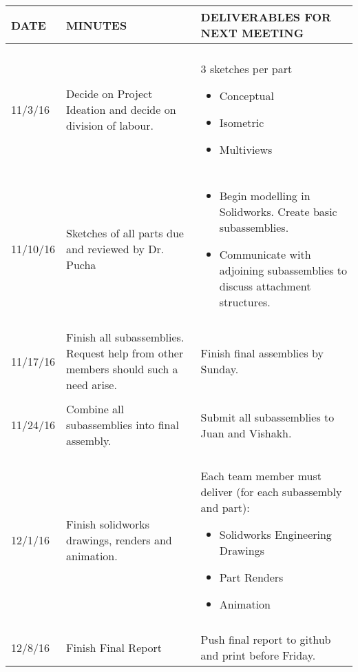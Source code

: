 \begin{table}[t]
\begin{center}
\begin{tabularx}{\textwidth}{|L|L|L|}
\hline
DATE & MINUTES & DELIVERABLES FOR NEXT MEETING \\
\hline
\hline
& & \\
11/3/16 & 
Decide on Project Ideation and decide on division of labour.
&
3 sketches per part 
\begin{itemize}
\item Conceptual
\item Isometric
\item Multiviews
\end{itemize}
\\
\hline
& & \\
11/10/16 &
 Sketches of all parts due and reviewed by Dr. Pucha
&
\begin{itemize}
\item Begin modelling in Solidworks. Create basic subassemblies.
\item Communicate with adjoining subassemblies to discuss attachment structures.
\end{itemize}
\\
\hline
& & \\
11/17/16 & 
Finish all subassemblies. Request help from other members should such a need arise.
&
Finish final assemblies by Sunday.
\\
\hline
& & \\
11/24/16 & 
Combine all subassemblies into final assembly.
&
Submit all subassemblies to Juan and Vishakh.
\\
\hline
& & \\
12/1/16 & 
Finish solidworks drawings, renders and animation.
&
Each team member must deliver (for each subassembly and part): 
\begin{itemize}
\item Solidworks Engineering Drawings
\item Part Renders
\item Animation
\end{itemize}
\\
\hline
& & \\
12/8/16 & 
Finish Final Report
&
Push final report to github and print before Friday.
\\
\hline




\end{tabularx}
\end{center}
\end{table}
